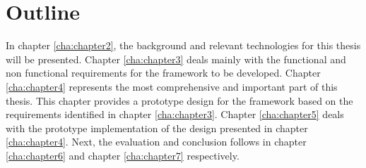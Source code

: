 \section{Outline\label{sec:intro_out}}
In chapter \ref{cha:chapter2}, the background and relevant technologies for this thesis will be presented. Chapter \ref{cha:chapter3} deals mainly with the functional and non functional requirements for the framework to be developed. Chapter \ref{cha:chapter4} represents the most comprehensive and important part of this thesis. This chapter provides a prototype design for the framework based on the requirements identified in chapter \ref{cha:chapter3}. Chapter \ref{cha:chapter5} deals with the prototype implementation of the design presented in chapter \ref{cha:chapter4}. Next, the evaluation and conclusion follows in chapter \ref{cha:chapter6} and chapter \ref{cha:chapter7} respectively.
%
%
%
%

